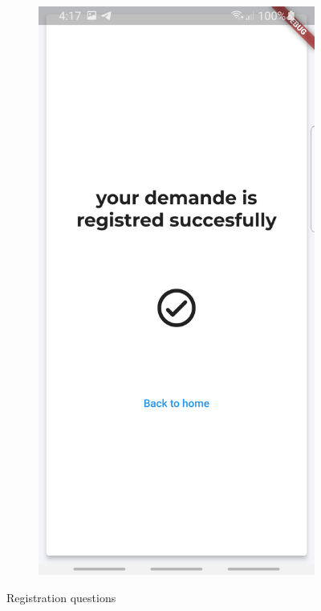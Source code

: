 \begin{figure}
\begin{subfigure}{.31\textwidth}
  \label{fig:sub-first}
\end{subfigure}
\begin{subfigure}{.31\textwidth}
  \centering
  \includegraphics[width=1\linewidth]{images1/ques7.jpg}  
  \label{fig:sub-first}
\end{subfigure}
\caption{Registration questions}
\label{fig:fig}
\end{figure}





